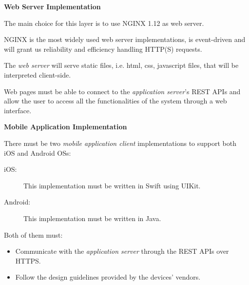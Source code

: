 \documentclass{article}
\begin{document}
	\newpage
	\bigskip
	\noindent
	\textbf{Web Server Implementation}

	\medskip
	\noindent
	The main choice for this layer is to use NGINX 1.12 as web server.

	NGINX is the most widely used web server implementations, is event-driven and will grant us reliability and efficiency handling HTTP(S) requests.

	\bigskip
	The \textit{web server} will serve static files, i.e. html, css, javascript files, that will be interpreted client-side.

	Web pages must be able to connect to the \textit{application server}'s REST APIs and allow the user to access all the functionalities of the system through a web interface.


	\bigskip
	\noindent
	\textbf{Mobile Application Implementation}

	\medskip
	\noindent
	There must be two \textit{mobile application client} implementations to support both iOS and Android OSs:
	\begin{description}
		\item [iOS:] This implementation must be written in Swift using UIKit.
		\item [Android:] This implementation must be written in Java.
	\end{description}

	\bigskip
	\noindent
	Both of them must:
	\begin{itemize}
	\item Communicate with the \textit{application server} through the REST APIs over HTTPS.
	\item Follow the design guidelines provided by the devices' vendors.
	\end{itemize}
\end{document}
